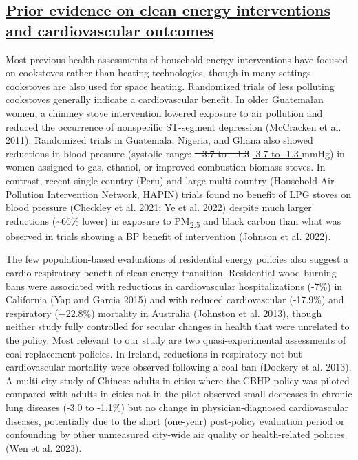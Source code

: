 \documentclass[
  letterpaper,
  DIV=11,
  numbers=noendperiod]{scrartcl}
\providecommand{\DIFadd}[1]{{\protect\color{blue}\underline{#1}}} %
\providecommand{\DIFdel}[1]{{\protect\color{red}\sout{#1}}}                      %
\providecommand{\DIFaddbegin}{} %
\providecommand{\DIFaddend}{} %
\providecommand{\DIFdelbegin}{} %
\providecommand{\DIFdelend}{} %
\newcommand{\DIFscaledelfig}{0.5}
\newlength{\DIFdelgraphicswidth} %
\newlength{\DIFdelgraphicsheight} %
\newcommand{\DIFaddincludegraphics}[2][]{{\color{blue}\fbox{\DIFOincludegraphics[#1]{#2}}}} %
\newcommand{\DIFdelincludegraphics}[2][]{%
\sbox{\DIFdelgraphicsbox}{\DIFOincludegraphics[#1]{#2}}%
\settoboxwidth{\DIFdelgraphicswidth}{\DIFdelgraphicsbox} %
\settoboxtotalheight{\DIFdelgraphicsheight}{\DIFdelgraphicsbox} %
\scalebox{\DIFscaledelfig}{%
\parbox[b]{\DIFdelgraphicswidth}{\usebox{\DIFdelgraphicsbox}\\[-\baselineskip] \rule{\DIFdelgraphicswidth}{0em}}\llap{\resizebox{\DIFdelgraphicswidth}{\DIFdelgraphicsheight}{%
\setlength{\unitlength}{\DIFdelgraphicswidth}%
\begin{picture}(1,1)%
\thicklines\linethickness{2pt} %
{\color[rgb]{1,0,0}\put(0,0){\framebox(1,1){}}}%
{\color[rgb]{1,0,0}\put(0,0){\line( 1,1){1}}}%
{\color[rgb]{1,0,0}\put(0,1){\line(1,-1){1}}}%
\end{picture}%
}\hspace*{3pt}}} %
} %
\DeclareRobustCommand{\DIFaddbegin}{\DIFOaddbegin \let\includegraphics\DIFaddincludegraphics} %
\DeclareRobustCommand{\DIFaddend}{\DIFOaddend \let\includegraphics\DIFOincludegraphics} %
\DeclareRobustCommand{\DIFdelbegin}{\DIFOdelbegin \let\includegraphics\DIFdelincludegraphics} %
\DeclareRobustCommand{\DIFdelend}{\DIFOaddend \let\includegraphics\DIFOincludegraphics} %
\begin{document}
\DIFdelbegin %
\DIFdelend \DIFaddbegin \subsection{\DIFadd{Prior evidence on clean energy interventions and
cardiovascular
outcomes}}\label{prior-evidence-on-clean-energy-interventions-and-cardiovascular-outcomes}
\DIFaddend 

Most previous health assessments of household energy interventions have
focused on cookstoves rather than heating technologies, though in many
settings cookstoves are also used for space heating. Randomized trials
of less polluting cookstoves generally indicate a cardiovascular
benefit. In older Guatemalan women, a chimney stove intervention lowered
exposure to air pollution and reduced the occurrence of nonspecific
ST-segment depression (McCracken et al. 2011). Randomized trials in
Guatemala, Nigeria, and Ghana also showed reductions in blood pressure
(systolic range: \DIFdelbegin \DIFdel{−3.7 to −1.3 }\DIFdelend \DIFaddbegin \DIFadd{-3.7 to -1.3 }\DIFaddend mmHg) in women assigned to gas, ethanol,
or improved combustion biomass stoves. In contrast, recent single
country (Peru) and large multi-country (Household Air Pollution
Intervention Network, HAPIN) trials found no benefit of LPG stoves on
blood pressure (Checkley et al. 2021; Ye et al. 2022) despite much
larger reductions (\textasciitilde66\% lower) in exposure to
PM\textsubscript{2.5} and black carbon than what was observed in trials
showing a BP benefit of intervention (Johnson et al. 2022).

The few population-based evaluations of residential energy policies also
suggest a cardio-respiratory benefit of clean energy transition.
Residential wood-burning bans were associated with reductions in
cardiovascular hospitalizations (-7\%) in California (Yap and Garcia
2015) and with reduced cardiovascular (-17.9\%) and respiratory
(−22.8\%) mortality in Australia (Johnston et al. 2013), though neither
study fully controlled for secular changes in health that were unrelated
to the policy. Most relevant to our study are two quasi-experimental
assessments of coal replacement policies. In Ireland, reductions in
respiratory not but cardiovascular mortality were observed following a
coal ban (Dockery et al. 2013). A multi-city study of Chinese adults in
cities where the CBHP policy was piloted compared with adults in cities
not in the pilot observed small decreases in chronic lung diseases (-3.0
to -1.1\%) but no change in physician-diagnosed cardiovascular diseases,
potentially due to the short (one-year) post-policy evaluation period or
confounding by other unmeasured city-wide air quality or health-related
policies (Wen et al. 2023).
\end{document}
